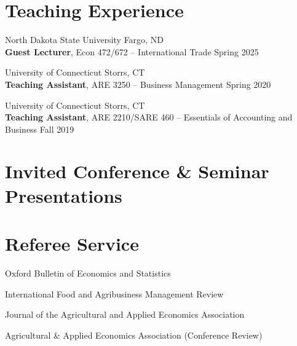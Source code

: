 \documentclass[10.5pt,letterpaper]{article}
\renewenvironment{itemize}{
	\begin{list}{}{
			\setlength{\leftmargin}{1.5em}
		}
	}{
	\end{list}
}
\begin{document}
	\section*{\textbf{Teaching Experience}}
	\begin{itemize}
		\item[-] North Dakota State University \hfill Fargo, ND \\
		\textbf{Guest Lecturer}, Econ 472/672 – International Trade \hfill Spring 2025
		
		\item[-] University of Connecticut \hfill Storrs, CT \\
		\textbf{Teaching Assistant}, ARE 3250 – Business Management \hfill Spring 2020
		
		\item[-] University of Connecticut \hfill Storrs, CT \\
		\textbf{Teaching Assistant}, ARE 2210/SARE 460 – Essentials of Accounting and Business \hfill Fall 2019
	\end{itemize}
	
	\section*{\textbf{Invited Conference \& Seminar Presentations}}
	
	\section*{\textbf{Referee Service}}
	\begin{itemize}
		\item[-] Oxford Bulletin of Economics and Statistics
		\item[-] International Food and Agribusiness Management Review
		\item[-] Journal of the Agricultural and Applied Economics Association
		\item[-] Agricultural \& Applied Economics Association (Conference Review)
	\end{itemize}
	
\end{document}
